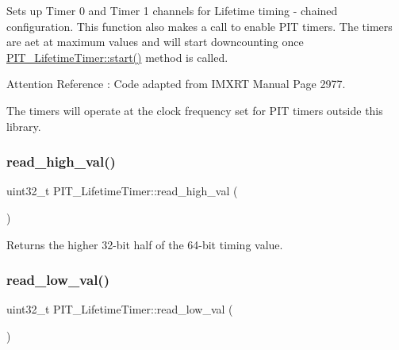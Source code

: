 Sets up Timer 0 and Timer 1 channels for Lifetime timing -\/ chained configuration. This function also makes a call to enable P\+IT timers. The timers are aet at maximum values and will start downcounting once \hyperlink{classPIT__LifetimeTimer_a6feabeff2529cabaf27ef53d027a4fc9}{P\+I\+T\+\_\+\+Lifetime\+Timer\+::start()} method is called. 

\begin{DoxyAttention}{Attention}
Reference \+: Code adapted from I\+M\+X\+RT Manual Page 2977. 

The timers will operate at the clock frequency set for P\+IT timers outside this library. 
\end{DoxyAttention}
\mbox{\label{classPIT__LifetimeTimer_a39b0861ac88aec5e53f326409d536bcf}} 
\subsubsection{\texorpdfstring{read\+\_\+high\+\_\+val()}{read\_high\_val()}}
{\footnotesize\ttfamily uint32\+\_\+t P\+I\+T\+\_\+\+Lifetime\+Timer\+::read\+\_\+high\+\_\+val (\begin{DoxyParamCaption}{ }\end{DoxyParamCaption})\hspace{0.3cm}{\ttfamily [inline]}}



Returns the higher 32-\/bit half of the 64-\/bit timing value. 

\mbox{\label{classPIT__LifetimeTimer_a4f7f8cd3847b9edb19dfa27f048a08cc}} 
\subsubsection{\texorpdfstring{read\+\_\+low\+\_\+val()}{read\_low\_val()}}
{\footnotesize\ttfamily uint32\+\_\+t P\+I\+T\+\_\+\+Lifetime\+Timer\+::read\+\_\+low\+\_\+val (\begin{DoxyParamCaption}{ }\end{DoxyParamCaption})\hspace{0.3cm}{\ttfamily [inline]}}



